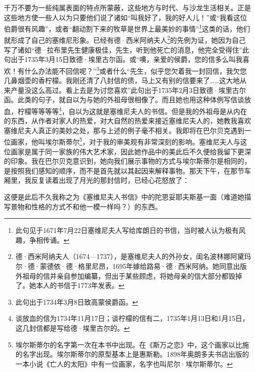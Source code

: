 \par 千万不要为一些纯属表面的特点所蒙蔽，这些地方与时代、与沙龙生活相关。正是这些地方使一些人以为只要他们说了诸如“叫我好了，我的好人儿！”或“我看这位伯爵很有风趣”，或者“翻动割下来的牧草是世界上最美妙的事情”\footnote{此句见于1671年7月22日塞维尼夫人写给库朗日的书信，当时被人认为极有风趣，争相传诵。}这类的话，他们就形成了自己的塞维尼形象。已经有德·西米阿纳夫人\footnote{德·西米阿纳夫人（1674—1737），是塞维尼夫人的外孙女，闺名波林娜阿黛玛尔·德·蒙德依·德·格里尼昂，1695年嫁给路易·德·西米阿纳。她同意出版外祖母的信并亲自参加编纂，但出于某些顾虑，将她母亲的信大部分都毁掉了。她本人的书信于1773年发表。}的先例为证，她因为自己写了诸如“德·拉布里先生健康极佳，先生，听到他死亡的消息，他完全受得住”此句出于1735年3月15日致德·埃里古尔函。或“噢，亲爱的侯爵，您的信多么叫我喜欢！有什么办法能不回信呢？”\footnote{此句出于1734年3月8日致高蒙侯爵函。}或者什么“先生，似乎您欠着我一封回信，我欠您几鼻烟壶的香柠檬。我刚还清了八封信的债，马上又有别的信要来了……这大地从来产量没这么高过。看上去是为讨您喜欢”此句出于1735年2月3日致德·埃里古尔函。此类的句子，就自以为与她的外祖母很相像了。而且她也用这种体例写信谈放血，柠檬等等等等\footnote{谈放血的信为1734年11月17日；谈柠檬的信有二，1735年1月13日和1月15日，这几封信都是写给德·埃里古尔的。}，自以为这就是塞维尼夫人的书信。但是我的外祖母是从内在的东西，从作者对家人的热爱，对大自然的热爱来接近塞维尼夫人的，她教我喜欢塞维尼夫人真正的美妙之处，那与上述的例子毫不相关。我即将在巴尔贝克遇到一位画家，他叫埃尔斯蒂尔\footnote{埃尔斯蒂尔的名字第一次在本书中出现。在《斯万之恋》中，这个画家以比施的名字出现。埃尔斯蒂尔的原型基本上是惠斯勒。1898年奥朗多夫书店出版的一本小说《亡人的太阳》中有一位画家，名字也叫尼尔·埃尔斯蒂尔。}，对于我的审美观有非常深刻的影响。塞维尼夫人与这位画家是属于同一家族的伟大艺术家，因此她作品中的美此后不久便给我留下更深的印象。我在巴尔贝克意识到，她向我们展示事物的方式与埃尔斯蒂尔是相同的，是按照我们感知的顺序，而不是首先就以其起因来解释事物。那天下午，在那节车厢里，我反复读着出现了月光的那封信时，已经心花怒放了：
\par 这便是此后不久我称之为《塞维尼夫人书信》中的陀思妥耶夫斯基一面（难道她描写景物和性格的方式不和他一模一样吗？）的东西。
